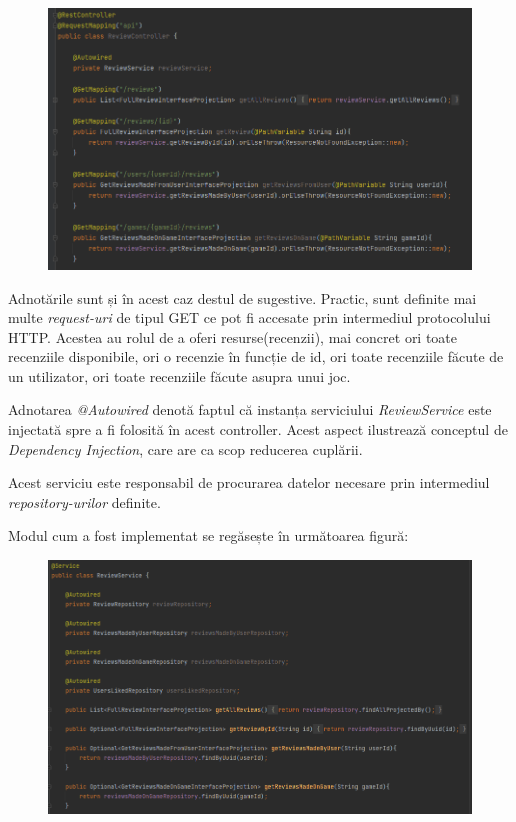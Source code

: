 \documentclass[12pt,a4paper]{report}
\begin{document}
\begin{figure}[H]
\centering
\caption{}
\includegraphics[scale = 0.7]{exemplu_21_review_controller}
\caption*{}
\end{figure}

Adnotările sunt și în acest caz destul de sugestive. Practic, sunt definite mai multe \emph{request-uri} de tipul GET ce pot fi accesate prin intermediul protocolului HTTP. Acestea au rolul de a oferi resurse(recenzii), mai concret ori toate recenziile disponibile, ori o recenzie în funcție de id, ori toate recenziile făcute de un utilizator, ori toate recenziile făcute asupra unui joc.

Adnotarea \emph{@Autowired} denotă faptul că instanța serviciului \emph{ReviewService} este injectată spre a fi folosită în acest controller. Acest aspect ilustrează conceptul de \emph{Dependency Injection}, care are ca scop reducerea cuplării. \cite{23}

Acest serviciu este responsabil de procurarea datelor necesare prin intermediul \emph{repository-urilor} definite.

Modul cum a fost implementat se regăsește în următoarea figură:

\begin{figure}[H]
\centering
\caption{}
\includegraphics[scale = 0.65]{exemplu_22_review_service}
\caption*{}
\end{figure}
\end{document}
